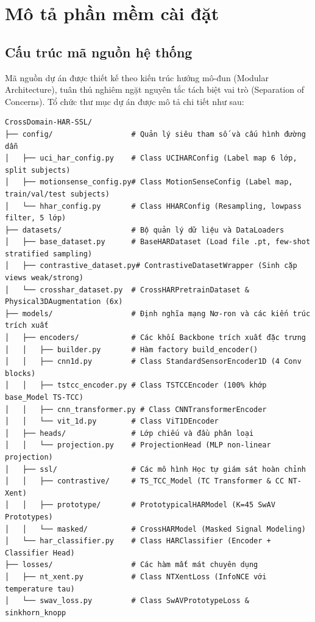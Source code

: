 \section{Mô tả phần mềm cài đặt}

\subsection{Cấu trúc mã nguồn hệ thống}
Mã nguồn dự án được thiết kế theo kiến trúc hướng mô-đun (Modular Architecture), tuân thủ nghiêm ngặt nguyên tắc tách biệt vai trò (Separation of Concerns). Tổ chức thư mục dự án được mô tả chi tiết như sau:

\begin{verbatim}
CrossDomain-HAR-SSL/
├── config/                  # Quản lý siêu tham số và cấu hình đường dẫn
│   ├── uci_har_config.py    # Class UCIHARConfig (Label map 6 lớp, split subjects)
│   ├── motionsense_config.py# Class MotionSenseConfig (Label map, train/val/test subjects)
│   └── hhar_config.py       # Class HHARConfig (Resampling, lowpass filter, 5 lớp)
├── datasets/                # Bộ quản lý dữ liệu và DataLoaders
│   ├── base_dataset.py      # BaseHARDataset (Load file .pt, few-shot stratified sampling)
│   ├── contrastive_dataset.py# ContrastiveDatasetWrapper (Sinh cặp views weak/strong)
│   └── crosshar_dataset.py  # CrossHARPretrainDataset & Physical3DAugmentation (6x)
├── models/                  # Định nghĩa mạng Nơ-ron và các kiến trúc trích xuất
│   ├── encoders/            # Các khối Backbone trích xuất đặc trưng
│   │   ├── builder.py       # Hàm factory build_encoder()
│   │   ├── cnn1d.py         # Class StandardSensorEncoder1D (4 Conv blocks)
│   │   ├── tstcc_encoder.py # Class TSTCCEncoder (100% khớp base_Model TS-TCC)
│   │   ├── cnn_transformer.py # Class CNNTransformerEncoder
│   │   └── vit_1d.py        # Class ViT1DEncoder
│   ├── heads/               # Lớp chiếu và đầu phân loại
│   │   └── projection.py    # ProjectionHead (MLP non-linear projection)
│   ├── ssl/                 # Các mô hình Học tự giám sát hoàn chỉnh
│   │   ├── contrastive/     # TS_TCC_Model (TC Transformer & CC NT-Xent)
│   │   ├── prototype/       # PrototypicalHARModel (K=45 SwAV Prototypes)
│   │   └── masked/          # CrossHARModel (Masked Signal Modeling)
│   └── har_classifier.py    # Class HARClassifier (Encoder + Classifier Head)
├── losses/                  # Các hàm mất mát chuyên dụng
│   ├── nt_xent.py           # Class NTXentLoss (InfoNCE với temperature tau)
│   └── swav_loss.py         # Class SwAVPrototypeLoss & sinkhorn_knopp

\end{verbatim}
